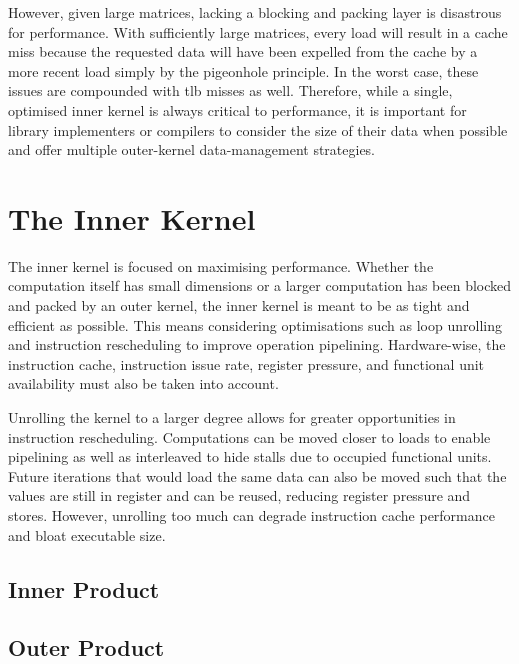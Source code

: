 \documentclass[\main/thesis.tex]{subfiles}
\begin{document}
However, given large matrices, lacking a blocking and packing layer is disastrous for performance.
With sufficiently large matrices, every load will result in a cache miss because the requested data will have been expelled from the cache by a more recent load simply by the pigeonhole principle.
In the worst case, these issues are compounded with \gls{tlb} misses as well.
Therefore, while a single, optimised inner kernel is always critical to performance, it is important for library implementers or compilers to consider the size of their data when possible and offer multiple outer-kernel data-management strategies.

\section{The Inner Kernel}
The inner kernel is focused on maximising performance.
Whether the computation itself has small dimensions or a larger computation has been blocked and packed by an outer kernel, the inner kernel is meant to be as tight and efficient as possible.
This means considering optimisations such as loop unrolling and instruction rescheduling to improve operation pipelining.
Hardware-wise, the instruction cache, instruction issue rate, register pressure, and functional unit availability must also be taken into account.

Unrolling the kernel to a larger degree allows for greater opportunities in instruction rescheduling.
Computations can be moved closer to loads to enable pipelining as well as interleaved to hide stalls due to occupied functional units.
Future iterations that would load the same data can also be moved such that the values are still in register and can be reused, reducing register pressure and stores.
However, unrolling too much can degrade instruction cache performance and bloat executable size.

\subsection{Inner Product}

\subsection{Outer Product}
\end{document}
